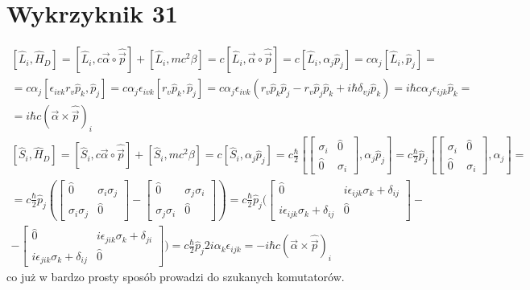 \documentclass[a4paper,12pt]{article}
\begin{document}
\section{Wykrzyknik 31}
$$
\begin{gathered}
\left[\hat{L}_i,\hat{H}_D\right] = \left[\hat{L}_i,c\vec{\alpha}\circ\hat{\vec{p}}\right] + \left[\hat{L}_i,mc^2\beta \right] = c\left[\hat{L}_i,\vec{\alpha}\circ\hat{\vec{p}}\right] = c\left[\hat{L}_i, \alpha_j\hat{p}_j\right] = c\alpha_j \left[\hat{L}_i,\hat{p}_j\right] = \\
= c\alpha_j\left[\epsilon_{ivk}r_v\hat{p}_k,\hat{p}_j\right] = c\alpha_j\epsilon_{ivk}\left[r_v \hat{p}_k,\hat{p}_j\right] =  c\alpha_j\epsilon_{ivk}\left(r_v \hat{p}_k\hat{p}_j-r_v\hat{p}_j \hat{p}_k +i\hbar \delta_{vj}\hat{p}_k\right) = i\hbar c\alpha_j \epsilon_{ijk} \hat{p}_k = \\
= i\hbar c (\vec{\alpha}\times\hat{\vec{p}})_i
\end{gathered}
$$
$$
\begin{gathered}
\left[\hat{S}_i,\hat{H}_D\right] = \left[\hat{S}_i,c\vec{\alpha}\circ\hat{\vec{p}}\right] + \left[\hat{S}_i,mc^2\beta \right] = c\left[\hat{S}_i,\alpha_j\hat{p}_j\right] = c\frac{\hbar}{2}\left[
\begin{bmatrix} \sigma_i & \hat{0} \\ \hat{0} &\sigma_i \end{bmatrix}  ,\alpha_j\hat{p}_j\right]
 = c\frac{\hbar}{2}\hat{p}_j \left[\begin{bmatrix} \sigma_i & \hat{0} \\ \hat{0} &\sigma_i \end{bmatrix},\alpha_j\right] = \\  = c\frac{\hbar}{2}\hat{p}_j \left( 
\begin{bmatrix}
\hat{0} & \sigma_i\sigma_j\\
\sigma_i\sigma_j & \hat{0}
\end{bmatrix} - \begin{bmatrix}
\hat{0} & \sigma_j\sigma_i\\
\sigma_j\sigma_i & \hat{0}
\end{bmatrix}
 \right) =c\frac{\hbar}{2}\hat{p}_j \bigg(\begin{bmatrix}
 \hat{0} & i\epsilon_{ijk}\sigma_k + \delta_{ij}\\
 i\epsilon_{ijk}\sigma_k + \delta_{ij} & \hat{0}
 \end{bmatrix} - \\ - \begin{bmatrix}
 \hat{0} & i\epsilon_{jik}\sigma_k + \delta_{ji}\\
 i\epsilon_{jik}\sigma_k + \delta_{ij} & \hat{0}
 \end{bmatrix} \bigg) =c\frac{\hbar}{2}\hat{p}_j 2i\alpha_k \epsilon_{ijk} = -i\hbar c(\vec{\alpha}\times\hat{\vec{p}})_i
\end{gathered}
$$
co już w bardzo prosty sposób prowadzi do szukanych komutatorów.
\end{document}
